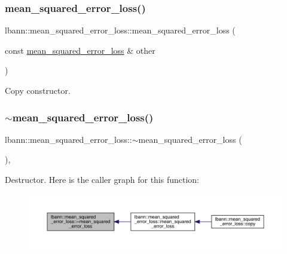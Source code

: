 \subsubsection{\texorpdfstring{mean\+\_\+squared\+\_\+error\+\_\+loss()}{mean\_squared\_error\_loss()}\hspace{0.1cm}{\footnotesize\ttfamily [2/2]}}
{\footnotesize\ttfamily lbann\+::mean\+\_\+squared\+\_\+error\+\_\+loss\+::mean\+\_\+squared\+\_\+error\+\_\+loss (\begin{DoxyParamCaption}\item[{const \hyperlink{classlbann_1_1mean__squared__error__loss}{mean\+\_\+squared\+\_\+error\+\_\+loss} \&}]{other }\end{DoxyParamCaption})\hspace{0.3cm}{\ttfamily [default]}}

Copy constructor. \mbox{\label{classlbann_1_1mean__squared__error__loss_a9c22711f4def47a20a2c4234e32881a0}} 
\subsubsection{\texorpdfstring{$\sim$mean\+\_\+squared\+\_\+error\+\_\+loss()}{~mean\_squared\_error\_loss()}}
{\footnotesize\ttfamily lbann\+::mean\+\_\+squared\+\_\+error\+\_\+loss\+::$\sim$mean\+\_\+squared\+\_\+error\+\_\+loss (\begin{DoxyParamCaption}{ }\end{DoxyParamCaption})\hspace{0.3cm}{\ttfamily [override]}, {\ttfamily [default]}}

Destructor. Here is the caller graph for this function\+:\nopagebreak
\begin{figure}[H]
\begin{center}
\leavevmode
\includegraphics[width=350pt]{classlbann_1_1mean__squared__error__loss_a9c22711f4def47a20a2c4234e32881a0_icgraph}
\end{center}
\end{figure}


